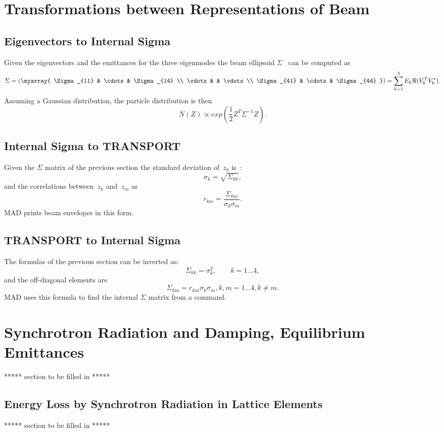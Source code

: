 \section{Transformations between Representations of Beam}

\subsection{Eigenvectors to Internal Sigma}
\label{EMCE2I}
Given the eigenvectors and the emittances for the three eigenmodes the
beam ellipsoid $\Sigma$~\cite{SLAC75} can be computed as
\[
\Sigma = \left(\myarray{
\Sigma_{11} & \cdots & \Sigma_{14} \\
\vdots      &        & \vdots \\
\Sigma_{41} & \cdots & \Sigma_{44}
}\right) =
\sum_{k=1}^3 E_k \Re (V_k^T V_k^*).
\]
Assuming a Gaussian distribution, the particle distribution is then
\[
N(Z) \propto exp(\frac{1}{2} Z^T \Sigma^{-1} Z).
\]

\subsection{Internal Sigma to TRANSPORT}
\label{EMCI2T}
Given the $\Sigma$ matrix of the previous section the standard
deviation of~$z_k$ is~\cite{SLAC75}:
\[
\sigma_k = \sqrt{\Sigma_{kk}},
\]
and the correlations between~$z_k$ and~$z_m$ as
\[
r_{km} = \frac{\Sigma_{km}}{\sigma_k \sigma_m}.
\]
MAD prints beam envelopes in this form.

\subsection{TRANSPORT to Internal Sigma}
\label{EMCT2I}
The formulas of the previous section can be inverted as:
\[
\Sigma_{kk} = \sigma_k^2, \qquad k = 1 \ldots 4,
\]
and the off-diagonal elements are
\[
\Sigma_{km} = r_{km} \sigma_k \sigma_m, k, m = 1 \ldots 4, k \neq m.
\]
MAD uses this formula to find the internal $\Sigma$ matrix from a
 command.

\section{Synchrotron Radiation and Damping, Equilibrium Emittances}
\label{EMDAMP}
***** section to be filled in *****

\subsection{Energy Loss by Synchrotron Radiation in Lattice Elements}
***** section to be filled in *****


